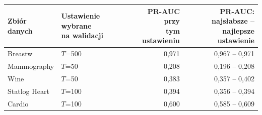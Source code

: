 \begin{tabular}{llrr}
\toprule
Zbiór danych & \makecell[l]{Ustawienie wybrane\\na walidacji} & \makecell[r]{PR-AUC przy\\tym ustawieniu} & \makecell[r]{PR-AUC: najsłabsze --\\najlepsze ustawienie} \\
\midrule
Breastw & $T$=500 & 0,971 & 0,967 -- 0,971 \\
Mammography & $T$=50 & 0,208 & 0,196 -- 0,208 \\
Wine & $T$=50 & 0,383 & 0,357 -- 0,402 \\
Statlog Heart & $T$=100 & 0,394 & 0,356 -- 0,394 \\
Cardio & $T$=100 & 0,600 & 0,585 -- 0,609 \\
\bottomrule
\end{tabular}
